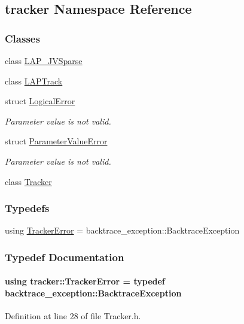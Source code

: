 \hypertarget{namespacetracker}{}\subsection{tracker Namespace Reference}
\label{namespacetracker}
\subsubsection*{Classes}
\begin{DoxyCompactItemize}
\item 
class \hyperlink{classtracker_1_1LAP__JVSparse}{L\+A\+P\+\_\+\+J\+V\+Sparse}
\item 
class \hyperlink{classtracker_1_1LAPTrack}{L\+A\+P\+Track}
\item 
struct \hyperlink{structtracker_1_1LogicalError}{Logical\+Error}
\begin{DoxyCompactList}\small\item\em Parameter value is not valid. \end{DoxyCompactList}\item 
struct \hyperlink{structtracker_1_1ParameterValueError}{Parameter\+Value\+Error}
\begin{DoxyCompactList}\small\item\em Parameter value is not valid. \end{DoxyCompactList}\item 
class \hyperlink{classtracker_1_1Tracker}{Tracker}
\end{DoxyCompactItemize}
\subsubsection*{Typedefs}
\begin{DoxyCompactItemize}
\item 
using \hyperlink{namespacetracker_afa61236fc365dda12f9244e9277ddf30}{Tracker\+Error} = backtrace\+\_\+exception\+::\+Backtrace\+Exception
\end{DoxyCompactItemize}


\subsubsection{Typedef Documentation}
\paragraph[{\texorpdfstring{Tracker\+Error}{TrackerError}}]{\setlength{\rightskip}{0pt plus 5cm}using {\bf tracker\+::\+Tracker\+Error} = typedef backtrace\+\_\+exception\+::\+Backtrace\+Exception}\hypertarget{namespacetracker_afa61236fc365dda12f9244e9277ddf30}{}\label{namespacetracker_afa61236fc365dda12f9244e9277ddf30}


Definition at line 28 of file Tracker.\+h.

